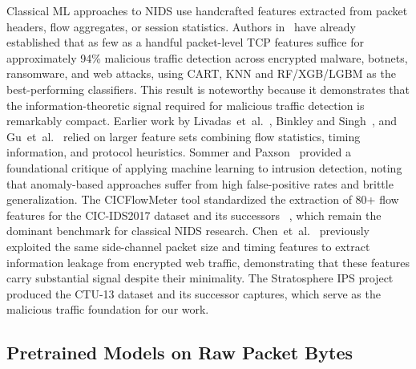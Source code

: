 \documentclass[conference]{IEEEtran}
\begin{document}
Classical ML approaches to NIDS use handcrafted features extracted from packet headers, flow aggregates, or session statistics. Authors in~\cite{stergiopoulos2018side, sharafaldin2018toward} have already established that as few as a handful packet-level TCP features suffice for approximately 94\% malicious traffic detection across encrypted malware, botnets, ransomware, and web attacks, using CART, KNN and RF/XGB/LGBM as the best-performing classifiers. This result is noteworthy because it demonstrates that the information-theoretic signal required for malicious traffic detection is remarkably compact. Earlier work by Livadas~et~al.~\cite{livadas2006botnet}, Binkley and Singh~\cite{binkley2006botnet}, and Gu~et~al.~\cite{gu2007bothunter} relied on larger feature sets combining flow statistics, timing information, and protocol heuristics. Sommer and Paxson~\cite{sommer2010outside} provided a foundational critique of applying machine learning to intrusion detection, noting that anomaly-based approaches suffer from high false-positive rates and brittle generalization. The CICFlowMeter tool standardized the extraction of 80+ flow features for the CIC-IDS2017 dataset and its successors ~\cite{Arash2017,sharafaldin2018toward}, which remain the dominant benchmark for classical NIDS research. Chen~et~al.~\cite{chen2010sidechannel} previously exploited the same side-channel packet size and timing features to extract information leakage from encrypted web traffic, demonstrating that these features carry substantial signal despite their minimality. The Stratosphere IPS project~\cite{garcia2014ctu13} produced the CTU-13 dataset and its successor captures, which serve as the malicious traffic foundation for our work.

\subsection{Pretrained Models on Raw Packet Bytes}
\end{document}
